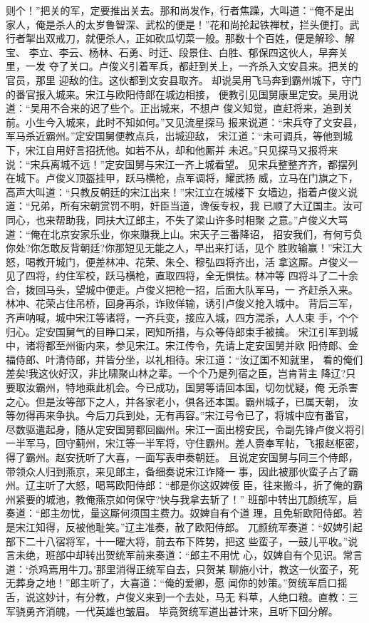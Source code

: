 则个！”把关的军，定要推出关去。那和尚发作，行者焦躁，大叫道：“俺不是出
家人，俺是杀人的太岁鲁智深、武松的便是！”花和尚抡起铁禅杖，拦头便打。武
行者掣出双戒刀，就便杀人，正如砍瓜切菜一般。那数十个百姓，便是解珍、解宝、
李立、李云、杨林、石勇、时迁、段景住、白胜、郁保四这伙人，早奔关里，一发
夺了关口。卢俊义引着军兵，都赶到关上，一齐杀入文安县来。把关的官员，那里
迎敌的住。这伙都到文安县取齐。
却说吴用飞马奔到霸州城下，守门的番官报入城来。宋江与欧阳侍郎在城边相接，
便教引见国舅康里定安。吴用说道：“吴用不合来的迟了些个。正出城来，不想卢
俊义知觉，直赶将来，追到关前。小生今入城来，此时不知如何。”又见流星探马
报来说道：“宋兵夺了文安县，军马杀近霸州。”定安国舅便教点兵，出城迎敌，
宋江道：“未可调兵，等他到城下，宋江自用好言招抚他。如若不从，却和他厮并
未迟。”只见探马又报将来说：“宋兵离城不远！”定安国舅与宋江一齐上城看望。
见宋兵整整齐齐，都摆列在城下。卢俊义顶盔挂甲，跃马横枪，点军调将，耀武扬
威，立马在门旗之下，高声大叫道：“只教反朝廷的宋江出来！”宋江立在城楼下
女墙边，指着卢俊义说道：“兄弟，所有宋朝赏罚不明，奸臣当道，谗佞专权，我
已顺了大辽国主。汝可同心，也来帮助我，同扶大辽郎主，不失了梁山许多时相聚
之意。”卢俊义大骂道：“俺在北京安家乐业，你来赚我上山。宋天子三番降诏，
招安我们，有何亏负你处?你怎敢反背朝廷?你那短见无能之人，早出来打话，见个
胜败输赢！”宋江大怒，喝教开城门，便差林冲、花荣、朱仝、穆弘四将齐出，活
拿这厮。卢俊义一见了四将，约住军校，跃马横枪，直取四将，全无惧怯。林冲等
四将斗了二十余合，拨回马头，望城中便走。卢俊义把枪一招，后面大队军马，一
齐赶杀入来。林冲、花荣占住吊桥，回身再杀，诈败佯输，诱引卢俊义抢入城中。
背后三军，齐声呐喊，城中宋江等诸将，一齐兵变，接应入城，四方混杀，人人束
手，个个归心。定安国舅气的目睁口呆，罔知所措，与众等侍郎束手被擒。
宋江引军到城中，诸将都至州衙内来，参见宋江。宋江传令，先请上定安国舅并欧
阳侍郎、金福侍郎、叶清侍郎，并皆分坐，以礼相待。宋江道：“汝辽国不知就里，
看的俺们差矣!我这伙好汉，非比啸聚山林之辈。一个个乃是列宿之臣，岂肯背主
降辽?只要取汝霸州，特地乘此机会。今已成功，国舅等请回本国，切勿忧疑，俺
无杀害之心。但是汝等部下之人，并各家老小，俱各还本国。霸州城子，已属天朝，
汝等勿得再来争执。今后刀兵到处，无有再容。”宋江号令已了，将城中应有番官，
尽数驱遣起身，随从定安国舅都回幽州。宋江一面出榜安民，令副先锋卢俊义将引
一半军马，回守蓟州，宋江等一半军将，守住霸州。差人赍奉军帖，飞报赵枢密，
得了霸州。赵安抚听了大喜，一面写表申奏朝廷。
且说定安国舅与同三个侍郎，带领众人归到燕京，来见郎主，备细奏说宋江诈降一
事，因此被那伙蛮子占了霸州。辽主听了大怒，喝骂欧阳侍郎：“都是你这奴婢佞
臣，往来搬斗，折了俺的霸州紧要的城池，教俺燕京如何保守?快与我拿去斩了！”
班部中转出兀颜统军，启奏道：“郎主勿忧，量这厮何须国主费力。奴婢自有个道
理，且免斩欧阳侍郎。若是宋江知得，反被他耻笑。”辽主准奏，赦了欧阳侍郎。
兀颜统军奏道：“奴婢引起部下二十八宿将军，十一曜大将，前去布下阵势，把这
些蛮子，一鼓儿平收。”说言未绝，班部中却转出贺统军前来奏道：“郎主不用忧
心，奴婢自有个见识。常言道：‘杀鸡焉用牛刀。’那里消得正统军自去，只贺某
聊施小计，教这一伙蛮子，死无葬身之地！”郎主听了，大喜道：“俺的爱卿，愿
闻你的妙策。”贺统军启口摇舌，说这妙计，有分教，卢俊义来到一个去处，马无
料草，人绝口粮。直教：三军骁勇齐消魄，一代英雄也皱眉。
毕竟贺统军道出甚计来，且听下回分解。